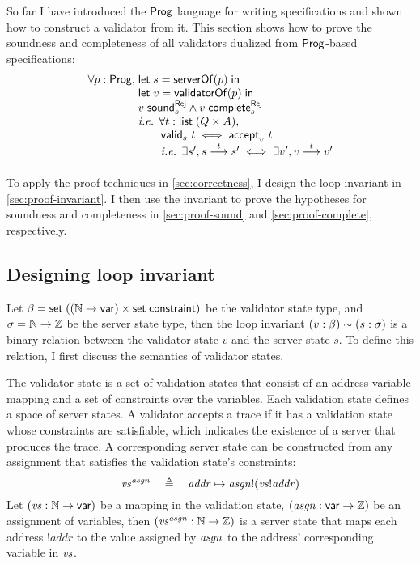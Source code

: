 So far I have introduced the $\mathsf{Prog}$ language for writing specifications and
shown how to construct a validator from it.  This section shows how to prove the
soundness and completeness of all validators dualized from $\mathsf{Prog}$-based
specifications:
\[\begin{array}{r@{\;}l}
\forall p:\Prog,&\letin{s}{\serverOf(p)}\\
&\letin{v}{\validatorOf(p)}\\
&\rejSound v s\wedge\rejComplete v s\\
&\text{\it i.e. }\forall t:\List(Q\times A),\\
&\qquad\valid s t\iff\accepts v t\\
&\qquad\text{\it i.e. }\exists s',\behaves s t s'\iff\exists v',\behaves v t v'
\end{array}\]

To apply the proof techniques in \autoref{sec:correctness}, I design the loop
invariant in \autoref{sec:proof-invariant}.  I then use the invariant to prove
the hypotheses for soundness and completeness in \autoref{sec:proof-sound}
and \autoref{sec:proof-complete}, respectively.

\subsection{Designing loop invariant}
\label{sec:proof-invariant}
Let $\beta=\mathsf{set}\;((\mathbb N\to\mathsf{var})\times\mathsf{set}\;\mathsf{constraint})$ be the validator state
type, and $\sigma=\mathbb N\to\mathbb Z$ be the server state type, then the loop invariant
$(v:\beta)\sim (s:\sigma)$ is a binary relation between the validator
state $v$ and the server state $s$.  To define this relation, I first discuss
the semantics of validator states.

The validator state is a set of validation states that consist of an
address-variable mapping and a set of constraints over the variables.  Each
validation state defines a space of server states.  A validator accepts a trace
if it has a validation state whose constraints are satisfiable, which indicates
the existence of a server that produces the trace.  A corresponding server state
can be constructed from any assignment that satisfies the validation state's
constraints:
\[\mathit{vs}^{\mathit{asgn}}\quad\triangleq\quad \mathit{addr}\mapsto \mathit{asgn}!(\mathit{vs}!\mathit{addr})\]
Let $(\mathit{vs}:\mathbb N\to\mathsf{var})$ be a mapping in the validation state,
$(\mathit{asgn}:\mathsf{var}\to\mathbb Z)$ be an assignment of variables, then
$(\mathit{vs}^{\mathit{asgn}}:\mathbb N\to\mathbb Z)$ is a server state that maps each address
$!\mathit{addr}$ to the value assigned by $\mathit{asgn}$ to the address' corresponding
variable in $\mathit{vs}$.

